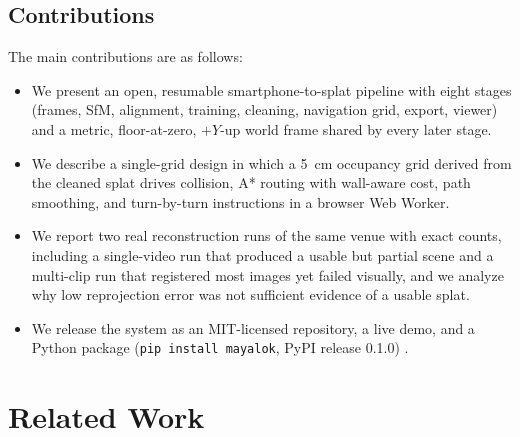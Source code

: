 \documentclass[conference]{IEEEtran}
\begin{document}
\subsection{Contributions}
The main contributions are as follows:
\begin{itemize}
    \item We present an open, resumable smartphone-to-splat pipeline with eight stages (frames, SfM, alignment, training, cleaning, navigation grid, export, viewer) and a metric, floor-at-zero, $+Y$-up world frame shared by every later stage.
    \item We describe a single-grid design in which a 5~cm occupancy grid derived from the cleaned splat drives collision, A* routing with wall-aware cost, path smoothing, and turn-by-turn instructions in a browser Web Worker.
    \item We report two real reconstruction runs of the same venue with exact counts, including a single-video run that produced a usable but partial scene and a multi-clip run that registered most images yet failed visually, and we analyze why low reprojection error was not sufficient evidence of a usable splat.
    \item We release the system as an MIT-licensed repository, a live demo, and a Python package (\texttt{pip install mayalok}, PyPI release 0.1.0) \cite{mayalokrepo}.
\end{itemize}

\section{Related Work}
\end{document}
